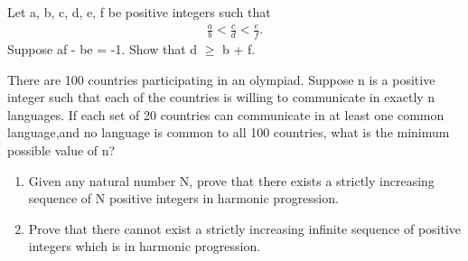 \item Let a, b, c, d, e, f be positive integers such that 
\begin{align*}
\frac{a}{b} < \frac{c}{d} < \frac{e}{f}.
\end{align*}
Suppose af - be = -1. Show that d $\geq$ b + f.

\item There are 100 countries participating in an olympiad. Suppose n is a positive integer such that each of the countries is willing to communicate in exactly n languages. If each set of 20 countries can communicate in at least one common language,and no language is common to all 100 countries, what is the minimum possible value of n?

\item 
\begin{enumerate}
\item Given any natural number N, prove that there exists a strictly increasing sequence of N positive integers in harmonic progression.
\item Prove that there cannot exist a strictly increasing infinite sequence of positive integers which is in harmonic progression.
\end{enumerate}
